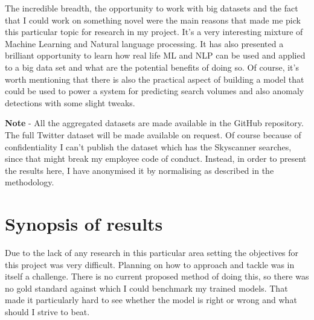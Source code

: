 \documentclass[minf,frontabs,twoside,singlespacing,parskip]{infthesis}
\begin{document}
The incredible breadth, the opportunity to work with big datasets and the fact that I could work on something novel were the main reasons that made me pick this particular topic for research in my project. It's a very interesting mixture of Machine Learning and Natural language processing. It has also presented a brilliant opportunity to learn how real life ML and NLP can be used and applied to a big data set and what are the potential benefits of doing so. Of course, it's worth mentioning that there is also the practical aspect of building a model that could be used to power a system for predicting search volumes and also anomaly detections with some slight tweaks. 


\textbf{Note} - All the aggregated datasets are made available in the GitHub repository. \cite{code} The full Twitter dataset will be made available on request. Of course because of confidentiality I can't publish the dataset which has the Skyscanner searches, since that might break my employee code of conduct. Instead, in order to present the results here, I have anonymised it by normalising as described in the methodology. 


%
%

\chapter{Synopsis of results}


Due to the lack of any research in this particular area setting the objectives for this project was very difficult. Planning on how to approach and tackle was in itself a challenge. There is no current proposed method of doing this, so there was no gold standard against which I could benchmark my trained models. That made it particularly hard to see whether the model is right or wrong and what should I strive to beat.
\end{document}
